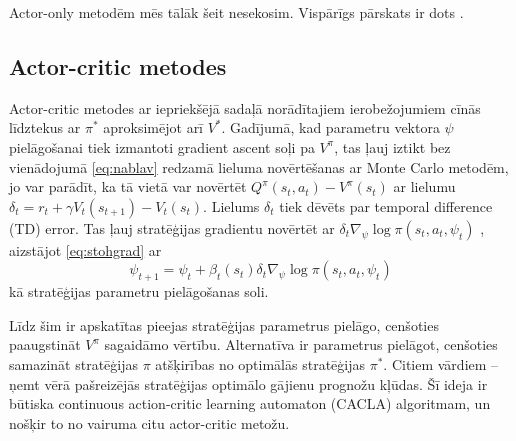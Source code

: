 \documentclass{ludis} %
\begin{document}
Actor-only metodēm mēs tālāk šeit nesekosim.
Vispārīgs pārskats ir dots \autocite{Hasselt2012}.
 
\subsection{Actor-critic metodes}
Actor-critic metodes ar iepriekšējā sadaļā norādītajiem ierobežojumiem cīnās līdztekus ar $\pi^*$ aproksimējot arī $V^*$.
Gadījumā, kad parametru vektora $\psi$ pielāgošanai tiek izmantoti gradient ascent soļi pa $V^\pi$, tas ļauj iztikt bez vienādojumā \eqref{eq:nablav} redzamā lieluma novērtēšanas ar Monte Carlo metodēm, jo var parādīt, ka tā vietā var novērtēt $Q^\pi(s_t, a_t) - V^\pi(s_t)$ ar lielumu $\delta_t = r_{t} + \gamma V_t(s_{t+1}) - V_t(s_t)$.
Lielums $\delta_t$ tiek dēvēts par temporal difference (TD) error.
Tas ļauj stratēģijas gradientu novērtēt ar $\delta_t \nabla_\psi \log \pi(s_t,a_t,\psi_t)$ \autocite{sutton2000policy}, aizstājot \eqref{eq:stohgrad} ar
\begin{equation} \label{eq:psi}
	\psi_{t+1} = \psi_t + \beta_t(s_t) \delta_t \nabla_\psi \log \pi(s_t,a_t,\psi_t)
\end{equation}
kā stratēģijas parametru pielāgošanas soli.

Līdz šim ir apskatītas pieejas stratēģijas parametrus pielāgo, cenšoties paaugstināt $V^\pi$ sagaidāmo vērtību.
Alternatīva ir parametrus pielāgot, cenšoties samazināt stratēģijas $\pi$ atšķirības no optimālās stratēģijas $\pi^*$.
Citiem vārdiem -- ņemt vērā pašreizējās stratēģijas optimālo gājienu prognožu kļūdas.
Šī ideja ir būtiska continuous action-critic learning automaton (CACLA) algoritmam, un nošķir to no vairuma citu actor-critic metožu.
\end{document}
